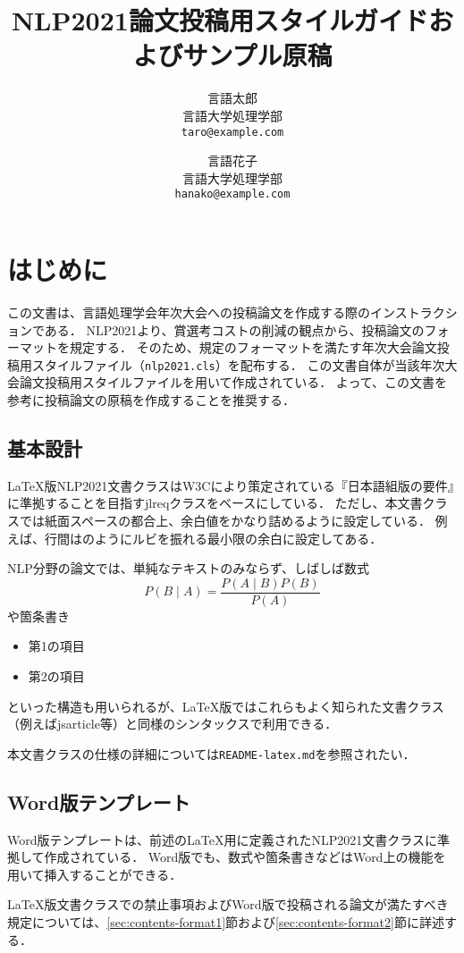 \documentclass[
  platex, dvipdfmx,  %
]{nlp2021}
\title{NLP2021論文投稿用スタイルガイドおよびサンプル原稿}
\author{%
  言語太郎 \\ 言語大学処理学部 \\ \texttt{taro@example.com}\and
  言語花子 \\ 言語大学処理学部 \\ \texttt{hanako@example.com}}
\newcommand{\pkg}[1]{\textsf{#1}}
\newcommand{\code}[1]{\texttt{#1}}
\begin{document}
\maketitle

\section{はじめに}
この文書は、言語処理学会年次大会への投稿論文を作成する際のインストラクションである．
NLP2021より、賞選考コストの削減の観点から、投稿論文のフォーマットを規定する．
そのため、規定のフォーマットを満たす年次大会論文投稿用スタイルファイル（\code{nlp2021.cls}）を配布する．
この文書自体が当該年次大会論文投稿用スタイルファイルを用いて作成されている．
よって、この文書を参考に投稿論文の原稿を作成することを推奨する．


\subsection{基本設計}
LaTeX版NLP2021文書クラスはW3Cにより策定されている『日本語組版の要件』\cite{JLREQ}に準拠することを目指す\pkg{jlreq}クラスをベースにしている．
ただし、本文書クラスでは紙面スペースの都合上、余白値をかなり詰めるように設定している．
例えば、行間はのようにルビを振れる最小限の余白に設定してある．

NLP分野の論文では、単純なテキストのみならず、しばしば数式
%
\begin{equation}
P(B\mid A) = \frac{P(A\mid B)P(B)}{P(A)}
\end{equation}
%
や箇条書き
%
\begin{itemize}
\item 第1の項目
\item 第2の項目
\end{itemize}
%
といった構造も用いられるが、LaTeX版ではこれらもよく知られた文書クラス（例えば\pkg{jsarticle}等）と同様のシンタックスで利用できる．

本文書クラスの仕様の詳細については\code{README-latex.md}を参照されたい．


\subsection{Word版テンプレート}
Word版テンプレートは、前述のLaTeX用に定義されたNLP2021文書クラスに準拠して作成されている．
Word版でも、数式や箇条書きなどはWord上の機能を用いて挿入することができる．

LaTeX版文書クラスでの禁止事項およびWord版で投稿される論文が満たすべき規定については、\ref{sec:contents-format1}節および\ref{sec:contents-format2}節に詳述する．
\end{document}
